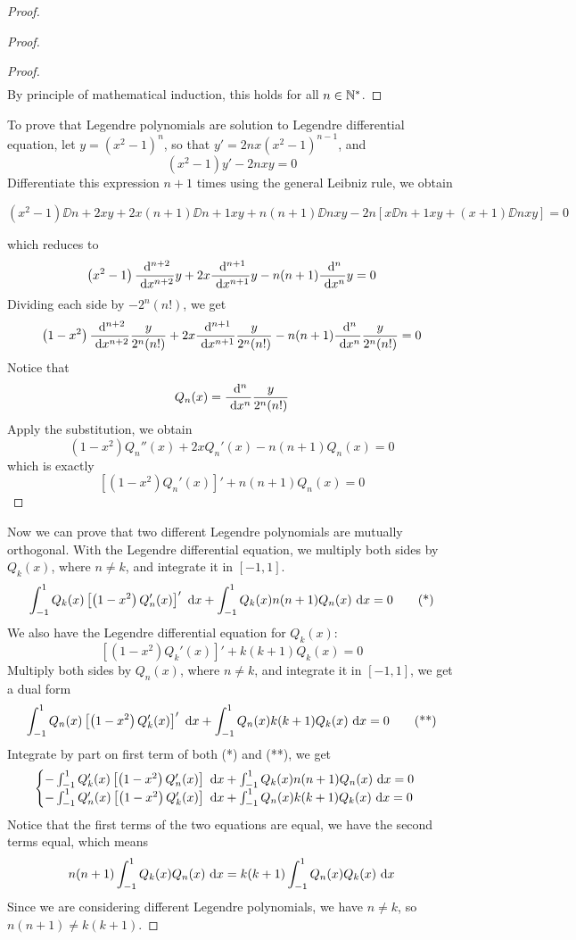 \begin{enumerate}
\begin{proof}
\begin{proof}
\begin{proof}
\begin{align*}
	\end{align*}
	By principle of mathematical induction, this holds for all \(n\in\mathbb{N}^*\).
	\end{proof}
	To prove that Legendre polynomials are solution to Legendre differential equation, let \(y=\left(x^2-1\right)^n\), so that \(y'=2nx\left(x^2-1\right)^{n-1}\), and 
	\[ \left(x^2-1\right)y'-2nxy=0 \]
	Differentiate this expression \(n+1\) times using the general Leibniz rule, we obtain
	\begin{small}
		\[ \left(x^2-1\right)\DD{n+2}{x}{y}+2x(n+1)\DD{n+1}{x}{y}+n(n+1)\DD{n}{x}{y}-2n\left[x\DD{n+1}{x}{y}+(x+1)\DD{n}{x}{y}\right]=0 \]
	\end{small}
	which reduces to 
	\[ \left(x^2-1\right)\frac{~\mathrm{d}^{n+2}}{~\mathrm{d}{x}^{n+2}}y+2x\frac{~\mathrm{d}^{n+1}}{~\mathrm{d}{x}^{n+1}}y-n(n+1)\frac{~\mathrm{d}^{n}}{~\mathrm{d}{x}^{n}}y=0 \]
	Dividing each side by \(-2^n(n!)\), we get
	\[ \left(1-x^2\right)\frac{~\mathrm{d}^{n+2}}{~\mathrm{d}{x}^{n+2}}\frac{y}{2^n(n!)}+2x\frac{~\mathrm{d}^{n+1}}{~\mathrm{d}{x}^{n+1}}\frac{y}{2^n(n!)}-n(n+1)\frac{~\mathrm{d}^{n}}{~\mathrm{d}{x}^{n}}\frac{y}{2^n(n!)}=0 \]
	Notice that
	\[ Q_n(x)=\frac{~\mathrm{d}^{n}}{~\mathrm{d}{x}^{n}}\frac{y}{2^n(n!)} \]
	Apply the substitution, we obtain
	\[ \left(1-x^2\right)Q_n''(x)+2xQ_n'(x)-n(n+1)Q_n(x)=0 \]
	which is exactly
	\[ \left[\left(1-x^2\right)Q_n'(x)\right]'+n(n+1)Q_n(x)=0 \]
	\end{proof}
	Now we can prove that two different Legendre polynomials are mutually orthogonal.
	With the Legendre differential equation, we multiply both sides by \(Q_k(x)\), where \(n\neq k\), and integrate it in \([-1,1]\).
	\[ \int_{-1}^{1} Q_k(x)\left[\left(1-x^2\right)Q_n'(x)\right]'~\mathrm{d} x + \int_{-1}^{1}Q_k(x)n(n+1)Q_n(x)~\mathrm{d} x=0 \tag{*} \]
	We also have the Legendre differential equation for \(Q_k(x)\):
	\[ \left[\left(1-x^2\right)Q_k'(x)\right]'+k(k+1)Q_k(x)=0 \]
	Multiply both sides by \(Q_n(x)\), where \(n\neq k\), and integrate it in \([-1,1]\), we get a dual form
	\[ \int_{-1}^{1} Q_n(x)\left[\left(1-x^2\right)Q_k'(x)\right]'~\mathrm{d} x + \int_{-1}^{1}Q_n(x)k(k+1)Q_k(x)~\mathrm{d} x=0 \tag{**} \]
	Integrate by part on first term of both (*) and (**), we get
	\[\begin{cases}
	-\int_{-1}^{1}Q_k'(x)\left[\left(1-x^2\right)Q_n'(x)\right]~\mathrm{d} x+\int_{-1}^{1}Q_k(x)n(n+1)Q_n(x)~\mathrm{d} x=0\\
	-\int_{-1}^{1}Q_n'(x)\left[\left(1-x^2\right)Q_k'(x)\right]~\mathrm{d} x+\int_{-1}^{1}Q_n(x)k(k+1)Q_k(x)~\mathrm{d} x=0
	\end{cases}\] 
	Notice that the first terms of the two equations are equal, we have the second terms equal, which means
	\[ n(n+1)\int_{-1}^{1}Q_k(x)Q_n(x)~\mathrm{d} x=k(k+1)\int_{-1}^{1}Q_n(x)Q_k(x)~\mathrm{d} x \]
	Since we are considering different Legendre polynomials, we have \(n\neq k\), so \(n(n+1)\neq k(k+1)\).

\end{proof}
\end{enumerate}
